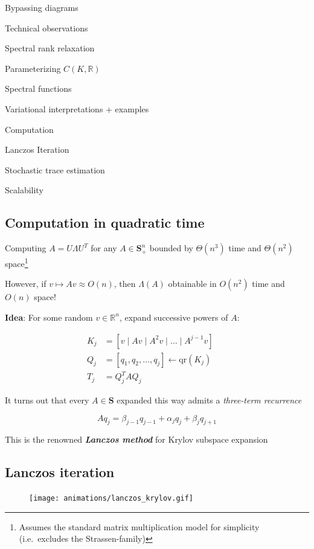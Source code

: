 \documentclass[
  letterpaper,
  DIV=11,
  numbers=noendperiod,
  oneside]{scrartcl}
\begin{document}
Bypassing diagrams

Technical observations

Spectral rank relaxation

Parameterizing \(C(K, \mathbb{R})\)

Spectral functions

Variational interpretations + examples

Computation

Lanczos Iteration

Stochastic trace estimation

Scalability

\subsection{Computation in quadratic
time}\label{computation-in-quadratic-time}

Computing \(A = U \Lambda U^T\) for any \(A \in \mathbf{S}_+^n\) bounded
by \(\Theta(n^3)\) time and \(\Theta(n^2)\) space\footnote{Assumes the
  standard matrix multiplication model for simplicity (i.e.~excludes the
  Strassen-family)}

However, if \(v \mapsto Av \approx O(n)\), then \(\Lambda(A)\)
obtainable in { \(O(n^2)\) time } and {\(O(n)\) space}!

\textbf{Idea}: For some random \(v \in \mathbb{R}^n\), expand successive
powers of \(A\):

\[ 
\begin{align}
K_j &= [ v \mid Av \mid A^2 v \mid \dots \mid A^{j-1}v] && \\
Q_j &= [ q_1, q_2, \dots, q_j] \gets \mathrm{qr}(K_j) && \\
T_j &= Q_j^T A Q_j &&
\end{align}
\]

It turns out that every \(A \in \mathbf{S}\) expanded this way admits a
\emph{three-term recurrence}

\[ A q_j = \beta_{j-1} q_{j-1} + \alpha_j q_j + \beta_j q_{j+1} \]

This is the renowned \emph{\textbf{Lanczos method}} for Krylov subspace
expansion

\subsection{Lanczos iteration}\label{lanczos-iteration}

\begin{figure}

{\centering \texttt{[image: animations/lanczos\_krylov.gif]}

}

\end{figure}
\end{document}
